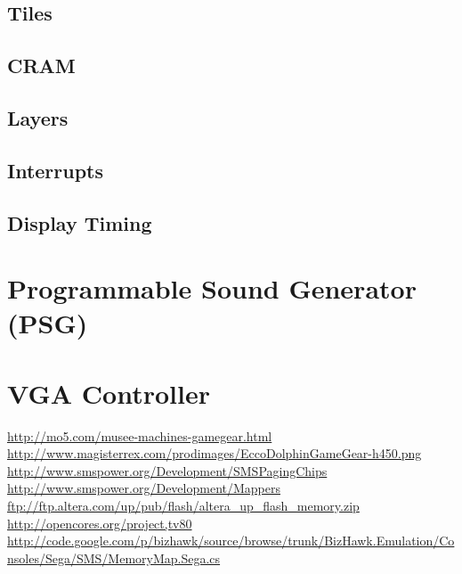 \documentclass{article}
\begin{document}
\subsection{Tiles}
\subsection{CRAM}
\subsection{Layers}
\subsection{Interrupts}
\subsection{Display Timing}
\section{Programmable Sound Generator (PSG)}
\section{VGA Controller}

\newpage
\begin{thebibliography}{9}
     \url{http://mo5.com/musee-machines-gamegear.html}
     \url{http://www.magisterrex.com/prodimages/EccoDolphinGameGear-h450.png}
     \url{http://www.smspower.org/Development/SMSPagingChips}
     \url{http://www.smspower.org/Development/Mappers}
     \url{ftp://ftp.altera.com/up/pub/flash/altera_up_flash_memory.zip}
     \url{http://opencores.org/project,tv80}
     \url{http://code.google.com/p/bizhawk/source/browse/trunk/BizHawk.Emulation/Consoles/Sega/SMS/MemoryMap.Sega.cs}
\end{thebibliography}
\end{document}
